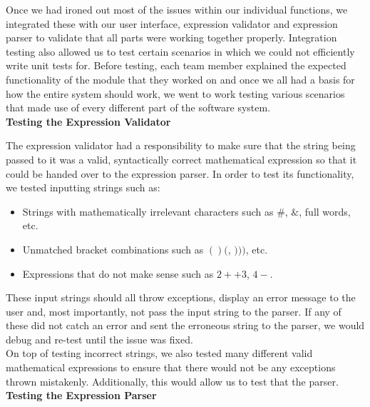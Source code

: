 \documentclass[a4paper, 12pt]{article}
\begin{document}
Once we had ironed out most of the issues within our individual functions, we integrated these with our user interface, expression validator and expression parser to validate that all parts were working together properly. Integration testing also allowed us to test certain scenarios in which we could not efficiently write unit tests for. Before testing, each team member explained the expected functionality of the module that they worked on and once we all had a basis for how the entire system should work, we went to work testing various scenarios that made use of every different part of the software system. 
\\

\textbf{Testing the Expression Validator}

The expression validator had a responsibility to make sure that the string being passed to it was a valid, syntactically correct mathematical expression so that it could be handed over to the expression parser. In order to test its functionality, we tested inputting strings such as:
\\

\begin{itemize}[noitemsep,topsep=0pt,parsep=0pt,partopsep=0pt]
\item Strings with mathematically irrelevant characters such as $\#$, $\&$, full words, etc.

\item Unmatched bracket combinations such as $()($, $)))$, etc.

\item Expressions that do not make sense such as $2++3$, $4-$.
\end{itemize}

\vspace{5mm}

These input strings should all throw exceptions, display an error message to the user and, most importantly, not pass the input string to the parser. If any of these did not catch an error and sent the erroneous string to the parser, we would debug and re-test until the issue was fixed.
\\

On top of testing incorrect strings, we also tested many different valid mathematical expressions to ensure that there would not be any exceptions thrown mistakenly. Additionally, this would allow us to test that the parser.
\\

\textbf{Testing the Expression Parser}
\end{document}
